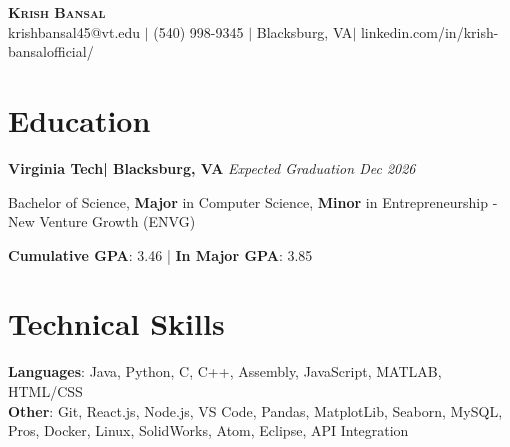 \documentclass[a4paper,11pt]{article}
\newcommand{\resumeItemizeListStart}{\begin{itemize}[leftmargin=0.15in, label={}]}
\newcommand{\resumeItemizeListEnd}{\vspace{-2pt}\end{itemize}}
\begin{document}
\begin{center}
    \textbf{\Huge \scshape Krish Bansal} \\ \vspace{2pt}
     {krishbansal45@vt.edu} $|$ 
    {(540) 998-9345} $|$ 
    {Blacksburg, VA}$|$ 
    {linkedin.com/in/krish-bansalofficial/}
\end{center}

\section{Education}
\textbf{Virginia Tech| Blacksburg, VA} \hfill \textit{Expected Graduation Dec 2026} 

{Bachelor of Science, \textbf{Major} in Computer Science, \textbf{Minor} in Entrepreneurship - New Venture Growth (ENVG)} 

\hspace{1cm} \textbf{Cumulative GPA}: 3.46 | \textbf{In Major GPA}: 3.85

\section{Technical Skills}
 \resumeItemizeListStart
    \small{\item{
     \textbf{Languages}{: Java, Python, C, C++, Assembly, JavaScript, MATLAB, HTML/CSS} \\
     \textbf{Other}{: Git, React.js, Node.js, VS Code, Pandas, MatplotLib, Seaborn, MySQL, Pros, Docker, Linux, SolidWorks, Atom, Eclipse, API Integration} \\
    }}
 \resumeItemizeListEnd

\end{document}
